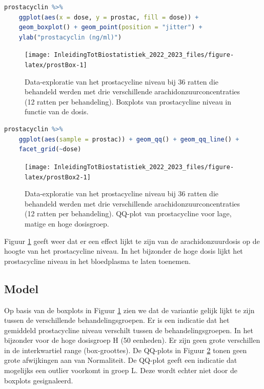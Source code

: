 \documentclass[
  12pt,dutch,coursenotes]{book}
\begin{document}
\begin{lstlisting}[language=R]
prostacyclin %>%
    ggplot(aes(x = dose, y = prostac, fill = dose)) +
    geom_boxplot() + geom_point(position = "jitter") +
    ylab("prostacyclin (ng/ml)")
\end{lstlisting}

\begin{figure}

{\centering \texttt{[image: InleidingTotBiostatistiek\_2022\_2023\_files/figure-latex/prostBox-1]} 

}

\caption{Data-exploratie van het prostacycline niveau bij 36 ratten die behandeld werden met drie verschillende arachidonzuurconcentraties (12 ratten per behandeling). Boxplots van prostacycline niveau in functie van de dosis.}\label{fig:prostBox}
\end{figure}

\begin{lstlisting}[language=R]
prostacyclin %>%
    ggplot(aes(sample = prostac)) + geom_qq() + geom_qq_line() +
    facet_grid(~dose)
\end{lstlisting}

\begin{figure}

{\centering \texttt{[image: InleidingTotBiostatistiek\_2022\_2023\_files/figure-latex/prostBox2-1]} 

}

\caption{Data-exploratie van het prostacycline niveau bij 36 ratten die behandeld werden met drie verschillende arachidonzuurconcentraties (12 ratten per behandeling). QQ-plot van prostacycline voor lage, matige en hoge dosisgroep.}\label{fig:prostBox2}
\end{figure}

Figuur \ref{fig:prostBox} geeft weer dat er een effect lijkt te zijn van de arachidonzuurdosis op de hoogte van het prostacycline niveau.
In het bijzonder de hoge dosis lijkt het prostacycline niveau in het bloedplasma te laten toenemen.

\hypertarget{model-1}{%
\subsection{Model}\label{model-1}}

Op basis van de boxplots in Figuur \ref{fig:prostBox} zien we dat de variantie gelijk lijkt te zijn tussen de verschillende behandelingsgroepen.
Er is een indicatie dat het gemiddeld prostacycline niveau verschilt tussen de behandelingsgroepen.
In het bijzonder voor de hoge dosisgroep H (50 eenheden).
Er zijn geen grote verschillen in de interkwartiel range (box-groottes).
De QQ-plots in Figuur \ref{fig:prostBox2} tonen geen grote afwijkingen aan van Normaliteit.
De QQ-plot geeft een indicatie dat mogelijks een outlier voorkomt in groep L.
Deze wordt echter niet door de boxplots gesignaleerd.
\end{document}
